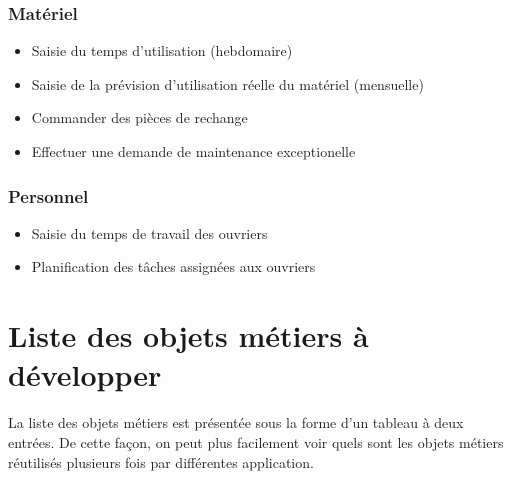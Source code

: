 \documentclass[twoside]{article}
\begin{document}
\subsubsection{Matériel}
\begin{itemize}
\item Saisie du temps d'utilisation (hebdomaire)
\item Saisie de la prévision d'utilisation réelle du matériel (mensuelle)
\item Commander des pièces de rechange
\item Effectuer une demande de maintenance exceptionelle
\end{itemize}

\subsubsection{Personnel}
\begin{itemize}
\item Saisie du temps de travail des ouvriers
\item Planification des tâches assignées aux ouvriers
\end{itemize}


\section{Liste des objets métiers à développer}

La liste des objets métiers est présentée sous la forme d'un tableau à deux
entrées. De cette façon, on peut plus facilement voir quels sont les objets
métiers réutilisés plusieurs fois par différentes application.\\
\end{document}
